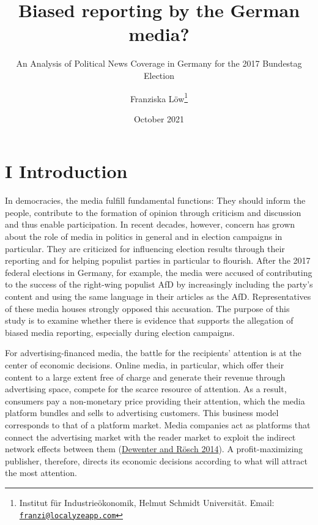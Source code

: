 \documentclass[
  12pt,
]{article}
\title{Biased reporting by the German media?}
\subtitle{An Analysis of Political News Coverage in Germany for the 2017
Bundestag Election}
\author{Franziska Löw\footnote{Institut für Industrieökonomik, Helmut
  Schmidt Universität. Email:
  \href{mailto:franzi@localyzeapp.com}{\nolinkurl{franzi@localyzeapp.com}}}}
\date{October 2021}
\begin{document}
\maketitle

\hypertarget{i-introduction}{%
\section{I Introduction}\label{i-introduction}}

In democracies, the media fulfill fundamental functions: They should
inform the people, contribute to the formation of opinion through
criticism and discussion and thus enable participation. In recent
decades, however, concern has grown about the role of media in politics
in general and in election campaigns in particular. They are criticized
for influencing election results through their reporting and for helping
populist parties in particular to flourish. After the 2017 federal
elections in Germany, for example, the media were accused of
contributing to the success of the right-wing populist AfD by
increasingly including the party's content and using the same language
in their articles as the AfD. Representatives of these media houses
strongly opposed this accusation. The purpose of this study is to
examine whether there is evidence that supports the allegation of biased
media reporting, especially during election campaigns.

For advertising-financed media, the battle for the recipients' attention
is at the center of economic decisions. Online media, in particular,
which offer their content to a large extent free of charge and generate
their revenue through advertising space, compete for the scarce resource
of attention. As a result, consumers pay a non-monetary price providing
their attention, which the media platform bundles and sells to
advertising customers. This business model corresponds to that of a
platform market. Media companies act as platforms that connect the
advertising market with the reader market to exploit the indirect
network effects between them
(\protect\hyperlink{ref-dewenter_einfuhrung_2014}{Dewenter and Rösch
2014}). A profit-maximizing publisher, therefore, directs its economic
decisions according to what will attract the most attention.
\end{document}
